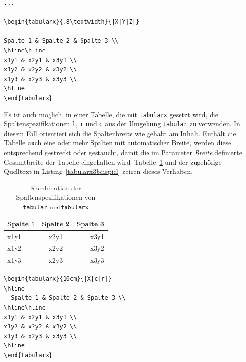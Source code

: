 \documentclass[a4paper,10pt,twoside]{scrbook}
\begin{document}
{\begin{lstlisting}[caption={Die Umgebung \texttt{tabularx} ermöglicht Tabellen mit definierbarer Breite und automatischer Spaltenbreite},label=tabularx2beispiel, style=customlatex]
...

\begin{tabularx}{.8\textwidth}{|X|Y|Z|}

Spalte 1 & Spalte 2 & Spalte 3 \\
\hline\hline
x1y1 & x2y1 & x3y1 \\
x1y2 & x2y2 & x3y2 \\
x1y3 & x2y3 & x3y3 \\
\hline
\end{tabularx}
\end{lstlisting}


Es ist auch möglich, in einer Tabelle, die mit \verb!tabularx! gesetzt wird, die Spaltenspezifikationen \verb!l!, \verb!r! und \verb!c! aus der Umgebung \verb!tabular! zu verwenden. In diesem Fall orientiert sich die Spaltenbreite wie gehabt am Inhalt. Enthält die Tabelle auch eine oder mehr Spalten mit automatischer Breite, werden diese entsprechend gestreckt oder gestaucht, damit die im Parameter \textsl{Breite} definierte Gesamtbreite der Tabelle eingehalten wird. Tabelle~\ref{Tabelle_tabularx3} und der zugehörige Quelltext in Listing~\ref{tabularx3beispiel} zeigen dieses Verhalten.



\begin{table}[h!tb]
\centering
\caption{Kombination der Spaltenspezifikationen von \texttt{tabular} und\texttt{tabularx}}
\label{Tabelle_tabularx3}
\begin{tabularx}{10cm}{|X|c|r|}
\hline
  Spalte 1 & Spalte 2 & Spalte 3 \\
\hline\hline
x1y1 & x2y1 & x3y1 \\
x1y2 & x2y2 & x3y2 \\
x1y3 & x2y3 & x3y3 \\
\hline
\end{tabularx}
\end{table}



\begin{lstlisting}[caption={Auch in der Umgebung \texttt{tabularx} sind die Spaltenspezifikationen von \texttt{tabular} erlaubt},label=tabularx3beispiel, style=customlatex]
\begin{tabularx}{10cm}{|X|c|r|}
\hline
  Spalte 1 & Spalte 2 & Spalte 3 \\
\hline\hline
x1y1 & x2y1 & x3y1 \\
x1y2 & x2y2 & x3y2 \\
x1y3 & x2y3 & x3y3 \\
\hline
\end{tabularx}
\end{lstlisting}


}
\end{document}
